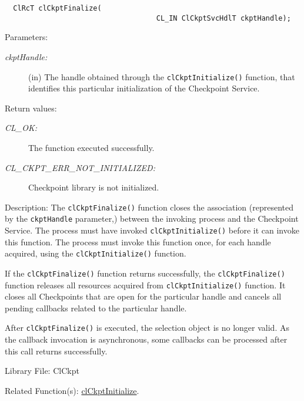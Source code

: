\begin{flushleft}
\begin{Desc}
\footnotesize\begin{verbatim}  ClRcT clCkptFinalize(
                              		CL_IN ClCkptSvcHdlT ckptHandle);
\end{verbatim}
\normalsize
\end{Desc}
\begin{Desc}
\item[Parameters:]
\begin{description}
\item[{\em ckpt\-Handle:}](in) The handle obtained through the {\tt{clCkptInitialize()}} function, that identifies this particular
initialization of the Checkpoint Service.\end{description}
\end{Desc}
\begin{Desc}
\item[Return values:]
\begin{description}
\item[{\em CL\_\-OK:}]The function executed successfully.
\item[{\em CL\_\-CKPT\_\-ERR\_\-NOT\_\-INITIALIZED:}]Checkpoint library is not initialized.
\end{description}
\end{Desc}
\begin{Desc}
\item[Description:]The {\tt{clCkptFinalize()}} function closes the association (represented by the {\tt{ckptHandle}} parameter,)
between the invoking process and the Checkpoint Service. The process must have
invoked {\tt{clCkptInitialize()}} before it can invoke this function. The process must invoke this function
once, for each handle acquired, using the {\tt{clCkptInitialize()}} function.
\par
If the {\tt{clCkptFinalize()}} function returns successfully, the {\tt{clCkptFinalize()}} function releases all
resources acquired from {\tt{clCkptInitialize()}} function. It closes all Checkpoints that are open for the particular handle and
cancels all pending callbacks related to the particular handle.
\par
After {\tt{clCkptFinalize()}} is executed, the selection object is no longer valid. As the
callback invocation is asynchronous, some callbacks can be processed after this call returns successfully.\end{Desc}
\begin{Desc}
\item[Library File:]Cl\-Ckpt\end{Desc}
\begin{Desc}
\item[Related Function(s):]\hyperlink{pageckpt101}{cl\-Ckpt\-Initialize}. \end{Desc}
\newpage




\end{flushleft}
